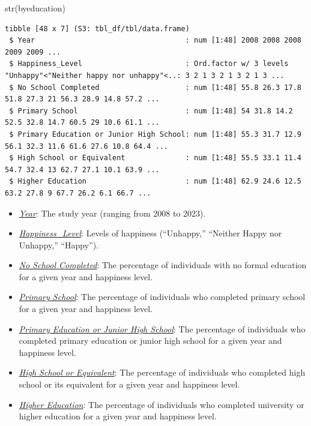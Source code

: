 \documentclass[
  11pt,
  a4paper,
  DIV=11,
  numbers=noendperiod]{scrartcl}
\newenvironment{Shaded}{\begin{snugshade}}{\end{snugshade}}
\newcommand{\FunctionTok}[1]{\textcolor[rgb]{0.28,0.35,0.67}{#1}}
\newcommand{\NormalTok}[1]{\textcolor[rgb]{0.00,0.23,0.31}{#1}}
\begin{document}
\begin{Shaded}
\begin{Highlighting}[]
 \FunctionTok{str}\NormalTok{(byeducation)}
\end{Highlighting}
\end{Shaded}

\begin{verbatim}
tibble [48 x 7] (S3: tbl_df/tbl/data.frame)
 $ Year                                   : num [1:48] 2008 2008 2008 2009 2009 ...
 $ Happiness_Level                        : Ord.factor w/ 3 levels "Unhappy"<"Neither happy nor unhappy"<..: 3 2 1 3 2 1 3 2 1 3 ...
 $ No School Completed                    : num [1:48] 55.8 26.3 17.8 51.8 27.3 21 56.3 28.9 14.8 57.2 ...
 $ Primary School                         : num [1:48] 54 31.8 14.2 52.5 32.8 14.7 60.5 29 10.6 61.1 ...
 $ Primary Education or Junior High School: num [1:48] 55.3 31.7 12.9 56.1 32.3 11.6 61.6 27.6 10.8 64.4 ...
 $ High School or Equivalent              : num [1:48] 55.5 33.1 11.4 54.7 32.4 13 62.7 27.1 10.1 63.9 ...
 $ Higher Education                       : num [1:48] 62.9 24.6 12.5 63.2 27.8 9 67.7 26.2 6.1 66.7 ...
\end{verbatim}

\begin{itemize}
\item
  \ul{\emph{Year}}: The study year (ranging from 2008 to 2023).
\item
  \ul{\emph{Happiness\_Level}}: Levels of happiness (``Unhappy,''
  ``Neither Happy nor Unhappy,'' ``Happy'').
\item
  \ul{\emph{No School Completed}}: The percentage of individuals with no
  formal education for a given year and happiness level.
\item
  \ul{\emph{Primary School}}: The percentage of individuals who
  completed primary school for a given year and happiness level.
\item
  \ul{\emph{Primary Education or Junior High School}}: The percentage of
  individuals who completed primary education or junior high school for
  a given year and happiness level.
\item
  \ul{\emph{High School or Equivalent}}: The percentage of individuals
  who completed high school or its equivalent for a given year and
  happiness level.
\item
  \ul{\emph{Higher Education}}: The percentage of individuals who
  completed university or higher education for a given year and
  happiness level.
\end{itemize}
\end{document}
